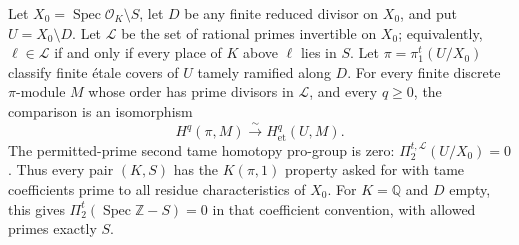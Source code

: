 \begin{theorem}
\label{D:arithmetic-tame}
Let $X_0=\operatorname{Spec}\mathcal O_K\setminus S$, let $D$ be
any finite reduced divisor on $X_0$, and put $U=X_0\setminus D$.
Let $\mathcal L$ be the set of rational primes invertible on $X_0$;
equivalently, $\ell\in\mathcal L$ if and only if every place of $K$
above $\ell$ lies in $S$. Let $\pi=\pi_1^t(U/X_0)$ classify finite
\'etale covers of $U$ tamely ramified along $D$.
For every finite discrete $\pi$-module $M$ whose order has prime
divisors in $\mathcal L$, and every $q\geq0$, the comparison is an
isomorphism
\[
 H^q(\pi,M)\xrightarrow{\ \sim\ }H^q_{\mathrm{et}}(U,M).
\]
The permitted-prime second tame homotopy pro-group is zero:
$\Pi_2^{t,\mathcal L}(U/X_0)=0$. Thus every pair $(K,S)$ has the
$K(\pi,1)$ property asked for with tame coefficients prime to all
residue characteristics of $X_0$. For $K=\mathbb Q$ and $D$ empty,
this gives $\Pi_2^t(\operatorname{Spec}\mathbb Z-S)=0$ in that
coefficient convention, with allowed primes exactly $S$.
\end{theorem}
